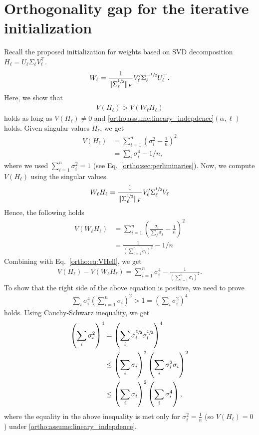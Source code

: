  \section{Orthogonality gap for the iterative initialization} \label{ortho:sec:init}
 Recall the proposed initialization for weights based on SVD decomposition $H_\ell = U_\ell \Sigma_\ell V_\ell^\top$.
 \begin{align*}
     W_\ell = \frac{1}{\| \Sigma_\ell^{\sfrac{1}{2}}\|_F} V_\ell' \Sigma_\ell^{-\sfrac{1}{2}} U_\ell^\top.
 \end{align*}
 Here, we show that 
 \begin{align}
      V(H_\ell) > V(W_\ell H_\ell) 
 \end{align}
 holds as long as $V(H_\ell) \neq 0$ and \ref{ortho:assume:lineary_indepdence}$(\alpha,\ell)$ holds. 
 Given singular values $H_\ell$, we get 
 \begin{equation}
     \label{ortho:eq:VHell}
     \begin{aligned} 
     V(H_\ell) &= \sum_{i=1}^n \left( \sigma_i^2 - \frac{1}{n}\right)^2 \\ 
     & = \sum_{i} \sigma_i^4 - 1/n, 
 \end{aligned}
 \end{equation}
 where we used $\sum_{i=1}^n \sigma_i^2 = 1$ (see Eq.~\eqref{ortho:sec:perliminaries}).
 Now, we compute $V(H_\ell)$ using the singular values. 
 \begin{align*}
     W_\ell H_\ell = \frac{1}{\| \Sigma_\ell^{\sfrac{1}{2}}\|_F}  V_\ell' \Sigma^{\sfrac{1}{2}}_\ell V_\ell 
 \end{align*}
 Hence, the following holds 
 \begin{align*}
      V(W_\ell H_\ell) & = \sum_{i=1}^n \left( \frac{\sigma_i}{\sum_j \sigma_j} - \frac{1}{n} \right)^2  \\ 
      & = \frac{1}{(\sum_{i=1}^n \sigma_i)^2} - 1/n
 \end{align*}
 Combining with Eq.~\eqref{ortho:eq:VHell}, we get 
 \begin{align*}
     V(H_\ell) - V(W_\ell H_\ell) = \sum_{i=1}^n \sigma_i^4 - \frac{1}{(\sum_{i=1}^n \sigma_i)^2} .
 \end{align*}
 To show that the right side of the above equation is positive, we need to prove  
 \begin{align*}
     \sum_{i} \sigma_i^4 \left(\sum_{i=1}^n \sigma_i\right)^2 > 1 = \left( \sum_{i} \sigma_i^2 \right)^4
 \end{align*}
 holds. Using Cauchy-Schwarz inequality, we get 
 \begin{align*}
     \left( \sum_{i} \sigma_i^2 \right)^4 & = \left( \sum_{i} \sigma_i^{\sfrac{3}{2}} \sigma_i^{\sfrac{1}{2}} \right)^4 \\ 
     & \leq \left( \sum_{i} \sigma_i \right)^2 \left( \sum_{i} \sigma_i^2 \sigma_i \right)^2 \\ 
     & \leq  \left( \sum_{i} \sigma_i \right)^2 \left( \sum_{i} \sigma_i^4 \right),
 \end{align*}
 where the equality in the above inequality is met only for $\sigma_i^2 = \frac{1}{n}$ (so $V(H_\ell) = 0$) under \ref{ortho:assume:lineary_indepdence}. 
 
